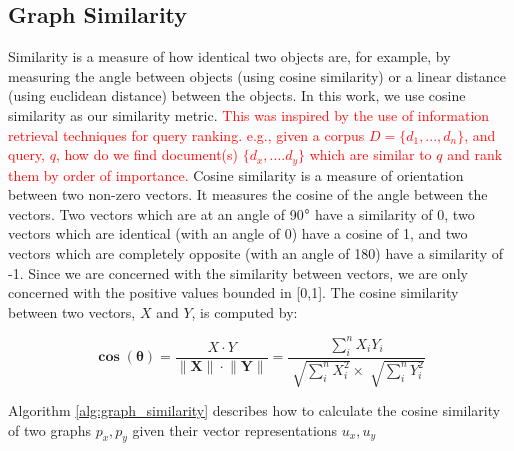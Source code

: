 %
% 
% 

\subsection{Graph Similarity} \label{similarity}
Similarity is a measure of how identical two objects are, for example, by measuring the angle between objects (using cosine similarity) or a linear distance (using euclidean distance) between the objects. In this work, we use cosine similarity as our similarity metric. \textcolor{red}{ This was inspired by the use of information retrieval techniques for query ranking. e.g., given a corpus $D = \{ d_1,..., d_n\}$, and query, $q$, how do we find document(s) $\{d_x,....d_y\}$ which are similar to $q$ and rank them by order of importance.} Cosine similarity is a measure of orientation between two non-zero vectors. It measures the cosine of the angle between the vectors. Two vectors which are at an angle of 90$\degree$ have a similarity of 0, two vectors which are identical (with an angle of 0\degree) have a cosine of 1, and two vectors which are completely opposite (with an angle of 180\degree) have a similarity of -1. Since we are concerned with the similarity between vectors, we are only concerned with the positive values bounded in [0,1]. The cosine similarity between two vectors, $X$ and $Y$, is computed by:

\[\mathbf{\cos{(\theta)}} = \dfrac{X \cdot  Y}{ \lVert \mathbf{X} \rVert \cdot \lVert \mathbf{Y} \rVert} =\dfrac{\sum_{i}^n X_i Y_i }{\sqrt[]{\sum_{i}^n X_i^2} \times \sqrt[]{\sum_{i}^n Y_i^2}}  \]

Algorithm \ref{alg:graph_similarity} describes how to calculate the cosine similarity of two graphs $p_x, p_y$ given their vector representations $u_x, u_y$


